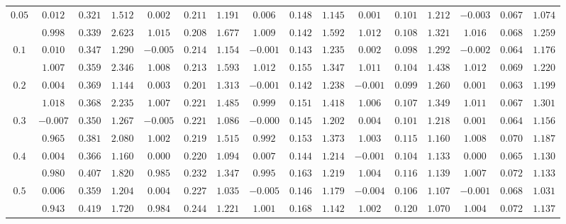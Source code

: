\begin{table}
\begin{center}
\begin{tabular}{|c|ccc|ccc|ccc|ccc|ccc|}
$0.05$ & $ 0.012 $ & $ 0.321 $ & $ 1.512 $ & $ 0.002 $ & $ 0.211 $ & $ 1.191 $ & $ 0.006 $ & $ 0.148 $ & $ 1.145 $ & $ 0.001 $ & $ 0.101 $ & $ 1.212 $ & $ -0.003 $ & $ 0.067 $ & $ 1.074 $\\ 
 & $ 0.998 $ & $ 0.339 $ & $ 2.623 $ & $ 1.015 $ & $ 0.208 $ & $ 1.677 $ & $ 1.009 $ & $ 0.142 $ & $ 1.592 $ & $ 1.012 $ & $ 0.108 $ & $ 1.321 $ & $ 1.016 $ & $ 0.068 $ & $ 1.259 $\\ 
\hline 
$0.1$ & $ 0.010 $ & $ 0.347 $ & $ 1.290 $ & $ -0.005 $ & $ 0.214 $ & $ 1.154 $ & $ -0.001 $ & $ 0.143 $ & $ 1.235 $ & $ 0.002 $ & $ 0.098 $ & $ 1.292 $ & $ -0.002 $ & $ 0.064 $ & $ 1.176 $\\ 
 & $ 1.007 $ & $ 0.359 $ & $ 2.346 $ & $ 1.008 $ & $ 0.213 $ & $ 1.593 $ & $ 1.012 $ & $ 0.155 $ & $ 1.347 $ & $ 1.011 $ & $ 0.104 $ & $ 1.438 $ & $ 1.012 $ & $ 0.069 $ & $ 1.220 $\\ 
\hline 
$0.2$ & $ 0.004 $ & $ 0.369 $ & $ 1.144 $ & $ 0.003 $ & $ 0.201 $ & $ 1.313 $ & $ -0.001 $ & $ 0.142 $ & $ 1.238 $ & $ -0.001 $ & $ 0.099 $ & $ 1.260 $ & $ 0.001 $ & $ 0.063 $ & $ 1.199 $\\ 
 & $ 1.018 $ & $ 0.368 $ & $ 2.235 $ & $ 1.007 $ & $ 0.221 $ & $ 1.485 $ & $ 0.999 $ & $ 0.151 $ & $ 1.418 $ & $ 1.006 $ & $ 0.107 $ & $ 1.349 $ & $ 1.011 $ & $ 0.067 $ & $ 1.301 $\\ 
\hline 
$0.3$ & $ -0.007 $ & $ 0.350 $ & $ 1.267 $ & $ -0.005 $ & $ 0.221 $ & $ 1.086 $ & $ -0.000 $ & $ 0.145 $ & $ 1.202 $ & $ 0.004 $ & $ 0.101 $ & $ 1.218 $ & $ 0.001 $ & $ 0.064 $ & $ 1.156 $\\ 
 & $ 0.965 $ & $ 0.381 $ & $ 2.080 $ & $ 1.002 $ & $ 0.219 $ & $ 1.515 $ & $ 0.992 $ & $ 0.153 $ & $ 1.373 $ & $ 1.003 $ & $ 0.115 $ & $ 1.160 $ & $ 1.008 $ & $ 0.070 $ & $ 1.187 $\\ 
\hline 
$0.4$ & $ 0.004 $ & $ 0.366 $ & $ 1.160 $ & $ 0.000 $ & $ 0.220 $ & $ 1.094 $ & $ 0.007 $ & $ 0.144 $ & $ 1.214 $ & $ -0.001 $ & $ 0.104 $ & $ 1.133 $ & $ 0.000 $ & $ 0.065 $ & $ 1.130 $\\ 
 & $ 0.980 $ & $ 0.407 $ & $ 1.820 $ & $ 0.985 $ & $ 0.232 $ & $ 1.347 $ & $ 0.995 $ & $ 0.163 $ & $ 1.219 $ & $ 1.004 $ & $ 0.116 $ & $ 1.139 $ & $ 1.007 $ & $ 0.072 $ & $ 1.133 $\\ 
\hline 
$0.5$ & $ 0.006 $ & $ 0.359 $ & $ 1.204 $ & $ 0.004 $ & $ 0.227 $ & $ 1.035 $ & $ -0.005 $ & $ 0.146 $ & $ 1.179 $ & $ -0.004 $ & $ 0.106 $ & $ 1.107 $ & $ -0.001 $ & $ 0.068 $ & $ 1.031 $\\ 
 & $ 0.943 $ & $ 0.419 $ & $ 1.720 $ & $ 0.984 $ & $ 0.244 $ & $ 1.221 $ & $ 1.001 $ & $ 0.168 $ & $ 1.142 $ & $ 1.002 $ & $ 0.120 $ & $ 1.070 $ & $ 1.004 $ & $ 0.072 $ & $ 1.137 $\\ 

\end{tabular}
\end{center}
\end{table}
